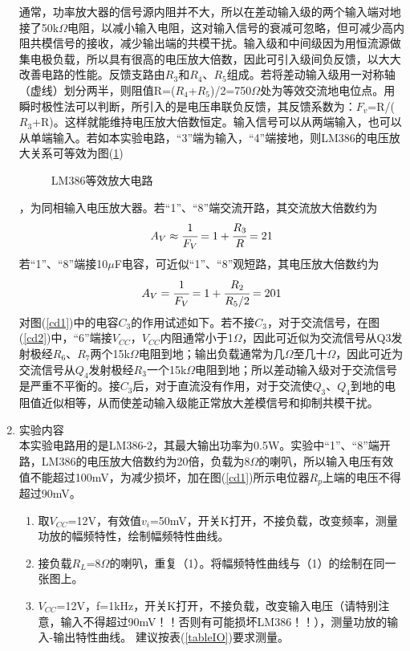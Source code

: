 \documentclass[a4paper]{article}
\begin{document}
\begin{enumerate}
通常，功率放大器的信号源内阻并不大，所以在差动输入级的两个输入端对地接了50k$\Omega$电阻，以减小输入电阻，这对输入信号的衰减可忽略，但可减少高内阻共模信号的接收，减少输出端的共模干扰。输入级和中间级因为用恒流源做集电极负载，所以具有很高的电压放大倍数，因此可引入级间负反馈，以大大改善电路的性能。反馈支路由$R_3$和$R_4$、$R_5$组成。若将差动输入级用一对称轴（虚线）划分两半，则阻值R=($R_4$+$R_5$)/2=750$\Omega$处为等效交流地电位点。用瞬时极性法可以判断，所引入的是电压串联负反馈，其反馈系数为：$F_v$=R/($R_3$+R)。这样就能维持电压放大倍数恒定。输入信号可以从两端输入，也可以从单端输入。若如本实验电路，“3”端为输入，“4”端接地，则LM386的电压放大关系可等效为图(\ref{cd3})
\begin{figure}[!h]
\centering
{}
\caption{LM386等效放大电路}\label{cd3}
\end{figure}
，为同相输入电压放大器。若“1”、“8”端交流开路，其交流放大倍数约为
\begin{equation}
A_V \approx \cfrac{1}{F_V} = 1+\cfrac{R_3}{R} = 21\label{eq1}
\end{equation}
若“1”、“8”端接10$\mu$F电容，可近似“1”、“8”观短路，其电压放大倍数约为
\begin{equation}
A_V = \cfrac{1}{F_V} = 1+\cfrac{R_2}{R_5/2} = 201
\end{equation}
对图(\ref{cd1})中的电容$C_3$的作用试述如下。若不接$C_3$，对于交流信号，在图(\ref{cd2})中，“6”端接$V_{CC}$，$V_{CC}$内阻通常小于1$\Omega$，因此可近似为交流信号从Q3发射极经$R_6$、$R_7$两个15k$\Omega$电阻到地；输出负载通常为几$\Omega$至几十$\Omega$，因此可近为交流信号从$Q_4$发射极经$R_3$一个15k$\Omega$电阻到地；所以差动输入级对于交流信号是严重不平衡的。接$C_3$后，对于直流没有作用，对于交流使$Q_3$、$Q_4$到地的电阻值近似相等，从而使差动输入级能正常放大差模信号和抑制共模干扰。

\item 实验内容\\
本实验电路用的是LM386-2，其最大输出功率为0.5W。实验中“1”、“8”端开路，LM386的电压放大倍数约为20倍，负载为8$\Omega$的喇叭，所以输入电压有效值不能超过100mV，为减少损坏，加在图(\ref{cd1})所示电位器$R_p$上端的电压不得超过90mV。
\begin{enumerate}
\item 取$V_{CC}$=12V，有效值$v_i$=50mV，开关K打开，不接负载，改变频率，测量功放的幅频特性，绘制幅频特性曲线。
\item 接负载$R_L$=8$\Omega$的喇叭，重复（1）。将幅频特性曲线与（1）的绘制在同一张图上。
\item $V_{CC}$=12V，f=1kHz，开关K打开，不接负载，改变输入电压（请特别注意，输入不得超过90mV！！否则有可能损坏LM386！！），测量功放的输入-输出特性曲线。
建议按表(\ref{tableIO})要求测量。


\end{enumerate}
\end{enumerate}
\end{document}
